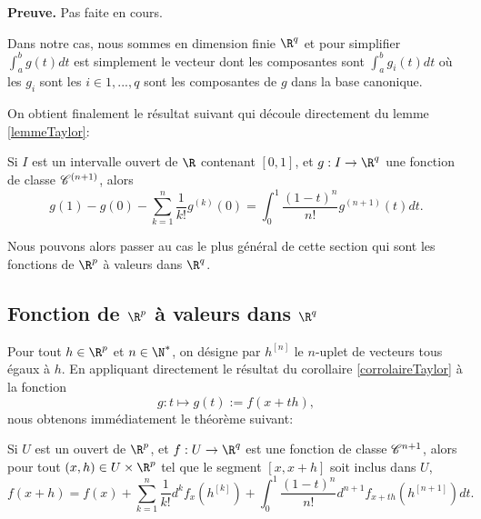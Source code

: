 \documentclass[class=report,crop=false]{standalone}
\begin{document}
{\textbf{Preuve.}} Pas faite en cours.

\begin{remarque*}
\textcolor[rgb]{0.00,0.00,1.00}{
  Dans notre cas, nous sommes en dimension finie $\R^q$ et pour simplifier $\displaystyle \int_a^b g(t)dt$ est simplement
  le vecteur dont les composantes sont $\displaystyle \int_a^b g_i(t)dt$ o\`u les $g_i$ sont les $i \in{1,...,q}$
  sont les composantes de $g$ dans la base canonique.}
 \end{remarque*}
 
 \noindent On obtient finalement le résultat suivant qui découle directement du lemme  \ref{lemmeTaylor}:
 
 \begin{corollaire} \label{corrolaireTaylor}
\textcolor[rgb]{0.44,0.00,0.87}{ 
    Si $I$ est un intervalle ouvert de $\R$ contenant $[0,1]$,  et
    $g:I \rightarrow \R^q$ une fonction de classe $\mathscr{C}^{(n+1)}$, alors
    \begin{equation*}
      g(1)-g(0)-\displaystyle \sum_{k=1}^{n} \dfrac{1}{k!}g^{(k)}(0)=\displaystyle \int_0^1 \dfrac{(1-t)^n}{n!}g^{(n+1)}(t)dt.
    \end{equation*}}
  \end{corollaire}
  
  \noindent Nous pouvons alors passer au cas le plus général de cette section qui sont les fonctions de $\R^p$ à valeurs dans $\R^q$.
\subsection{Fonction de $\R^p$ \`a valeurs dans $\R^q$}
Pour tout $h \in \R^p$ et $n \in \N^*$, on d\'esigne par $h^{[n]}$ le $n$-uplet de vecteurs tous \'egaux \`a $h$. En appliquant directement le résultat du corollaire \ref{corrolaireTaylor} à la fonction
\begin{equation*}
g: t \mapsto g(t):=f(x+th),
\end{equation*}
nous obtenons immédiatement le théorème suivant:

\begin{theoreme}
\textcolor[rgb]{0.44,0.00,0.87}{
  Si $U$ est un ouvert de $\R^p$,  et $f: U \rightarrow \R^q$ est une fonction
  de classe $\mathscr{C}^{n+1}$, alors pour tout $(x,h) \in U \times \R^p$ tel que le segment
  $[x,x+h]$ soit inclus dans $U$,
  \begin{equation*}
    f(x+h)=f(x)+ \displaystyle \sum_{k=1}^{n} \dfrac{1}{k!}d^kf_x(h^{[k]})+\displaystyle \int_0^1 \dfrac{(1-t)^n}{n!}d^{n+1}f_{x+th}(h^{[n+1]})dt.
  \end{equation*}}
\end{theoreme}
\end{document}
